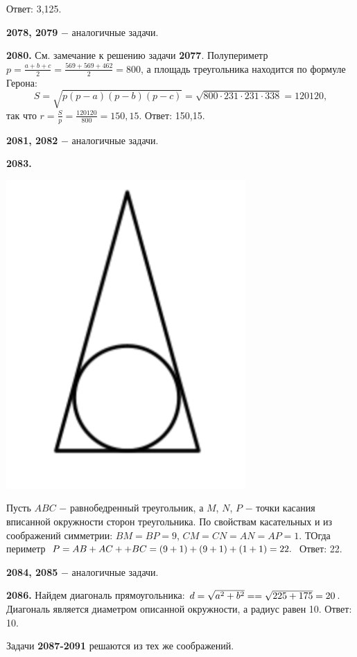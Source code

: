  \null \hspace*{\fill} Ответ: 3,125.

\textbf{2078, 2079} $-$ аналогичные задачи. 

\textbf{2080.} См. замечание к решению задачи \textbf{2077}.   Полупериметр \linebreak$p = \frac{a+b+c}{2} = \frac{569+569+462}{2}=800$, а площадь треугольника находится по формуле Герона:
\[
S = \sqrt{p(p-a)(p-b)(p-c)} = \sqrt{800\cdot231\cdot231\cdot338} = 120120,
\]
так что $r = \frac{S}{p} = \frac{120120}{800} = 150,15.$ \newline \null \hspace*{\fill} Ответ: 150,15.

\textbf{2081, 2082} $-$ аналогичные задачи.

\textbf{2083.}

{\centering \includegraphics[width=0.35\linewidth]{Geometry/Content/39.png}
	
}

Пусть $ABC$ $-$ равнобедренный треугольник, а $M$, $N$, $P$ $-$ точки касания вписанной окружности сторон треугольника. По свойствам касательных и из соображений симметрии: $BM = BP = 9$, $CM = CN = AN = AP = 1$. ТОгда периметр $P = AB + AC + \linebreak+BC = (9 + 1) + (9 + 1) + (1 + 1) = 22.$ \newline \null \hspace*{\fill} Ответ: 22.

\textbf{2084, 2085} $-$ аналогичные задачи.

\textbf{2086.} Найдем диагональ прямоугольника: $d = \sqrt{a^2+b^2} = \linebreak = \sqrt{225+175} = 20$.  Диагональ является диаметром описанной окружности, а радиус равен 10. \newline \null \hspace*{\fill} Ответ: 10.

Задачи \textbf{2087-2091} решаются из тех же соображений.

